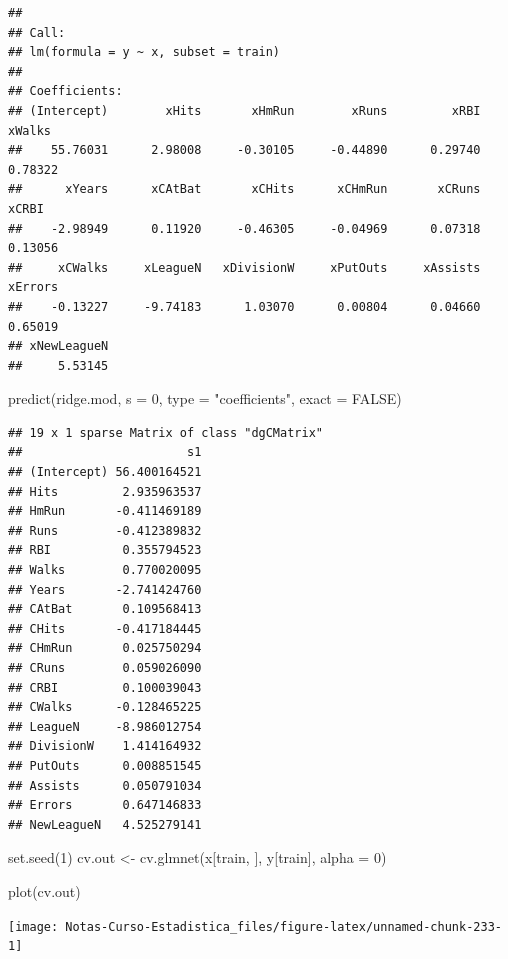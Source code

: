 \documentclass[
  12pt,
]{book}
\newenvironment{Shaded}{\begin{snugshade}}{\end{snugshade}}
\newcommand{\AttributeTok}[1]{\textcolor[rgb]{0.77,0.63,0.00}{#1}}
\newcommand{\ConstantTok}[1]{\textcolor[rgb]{0.00,0.00,0.00}{#1}}
\newcommand{\DecValTok}[1]{\textcolor[rgb]{0.00,0.00,0.81}{#1}}
\newcommand{\FunctionTok}[1]{\textcolor[rgb]{0.00,0.00,0.00}{#1}}
\newcommand{\NormalTok}[1]{#1}
\newcommand{\OtherTok}[1]{\textcolor[rgb]{0.56,0.35,0.01}{#1}}
\newcommand{\StringTok}[1]{\textcolor[rgb]{0.31,0.60,0.02}{#1}}
\theoremstyle{definition}
\theoremstyle{definition}
\theoremstyle{definition}
\theoremstyle{definition}
\theoremstyle{remark}
\begin{document}
\begin{verbatim}
## 
## Call:
## lm(formula = y ~ x, subset = train)
## 
## Coefficients:
## (Intercept)        xHits       xHmRun        xRuns         xRBI       xWalks  
##    55.76031      2.98008     -0.30105     -0.44890      0.29740      0.78322  
##      xYears      xCAtBat       xCHits      xCHmRun       xCRuns        xCRBI  
##    -2.98949      0.11920     -0.46305     -0.04969      0.07318      0.13056  
##     xCWalks     xLeagueN   xDivisionW     xPutOuts     xAssists      xErrors  
##    -0.13227     -9.74183      1.03070      0.00804      0.04660      0.65019  
## xNewLeagueN  
##     5.53145
\end{verbatim}

\begin{Shaded}
\begin{Highlighting}[]
\FunctionTok{predict}\NormalTok{(ridge.mod, }\AttributeTok{s =} \DecValTok{0}\NormalTok{, }\AttributeTok{type =} \StringTok{"coefficients"}\NormalTok{, }\AttributeTok{exact =} \ConstantTok{FALSE}\NormalTok{)}
\end{Highlighting}
\end{Shaded}

\begin{verbatim}
## 19 x 1 sparse Matrix of class "dgCMatrix"
##                       s1
## (Intercept) 56.400164521
## Hits         2.935963537
## HmRun       -0.411469189
## Runs        -0.412389832
## RBI          0.355794523
## Walks        0.770020095
## Years       -2.741424760
## CAtBat       0.109568413
## CHits       -0.417184445
## CHmRun       0.025750294
## CRuns        0.059026090
## CRBI         0.100039043
## CWalks      -0.128465225
## LeagueN     -8.986012754
## DivisionW    1.414164932
## PutOuts      0.008851545
## Assists      0.050791034
## Errors       0.647146833
## NewLeagueN   4.525279141
\end{verbatim}

\begin{Shaded}
\begin{Highlighting}[]
\FunctionTok{set.seed}\NormalTok{(}\DecValTok{1}\NormalTok{)}
\NormalTok{cv.out }\OtherTok{\textless{}{-}} \FunctionTok{cv.glmnet}\NormalTok{(x[train, ], y[train], }\AttributeTok{alpha =} \DecValTok{0}\NormalTok{)}

\FunctionTok{plot}\NormalTok{(cv.out)}
\end{Highlighting}
\end{Shaded}

\begin{center}\texttt{[image: Notas-Curso-Estadistica\_files/figure-latex/unnamed-chunk-233-1]} \end{center}
\end{document}
